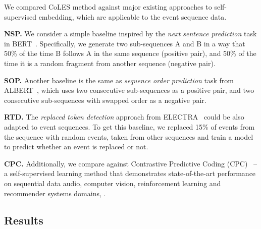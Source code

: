\documentclass[sigconf]{acmart}
\begin{document}
We compared CoLES method against major existing approaches to self-supervised embedding, which are
applicable to the event sequence data.

\textbf{NSP.} We consider a simple baseline inspired by the \emph{next sentence prediction} task
in BERT~\citep{Devlin2019BERTPO}. Specifically, we generate two sub-sequences A and B in a way
that 50\% of the time B follows A in the same sequence (positive pair), and 50\% of the time it
is a random fragment from another sequence (negative pair).

\textbf{SOP.} Another baseline is the same as \emph{sequence order prediction} task from
ALBERT~\citep{Lan2020ALBERTAL}, which uses two consecutive sub-sequences as a positive pair,
and two consecutive sub-sequences with swapped order as a negative pair.

\textbf{RTD.} The \emph{replaced token detection} approach from ELECTRA~\citep{Clark2020ELECTRAPT}
could be also adapted to event sequences. To get this baseline, we replaced 15\% of events from
the sequence with random events, taken from other sequences and train a model to predict whether
an event is replaced or not.

\textbf{CPC.} Additionally, we compare against Contrastive Predictive Coding
(CPC)~\citep{Oord2018RepresentationLW} -- a self-supervised learning method that demonstrates state-of-the-art
performance on sequential data audio, computer vision, reinforcement learning and recommender
systems domains,
\citep{Zhou2020ContrastiveLF}.

\subsection{Results} \label{sec-res}
\end{document}

